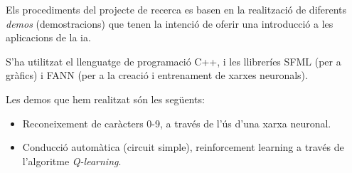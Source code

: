 Els procediments del projecte de recerca es basen en la realització de diferents \emph{demos} (demostracions)
que tenen la intenció de oferir una introducció a les aplicacions de la \ac{ia}.

S'ha utilitzat el llenguatge de programació C++, i les llibreríes SFML \autocite{sfmllib} (per a gràfics) i FANN \cite{fannlib} (per a la
creació i entrenament de xarxes neuronals).

Les demos que hem realitzat són les següents:

\begin{itemize}
\item Reconeixement de caràcters 0-9, a través de l'ús d'una xarxa neuronal.
\item Conducció automàtica (circuit simple), reinforcement learning a través de l'algoritme \emph{Q-learning}.
\end{itemize}
